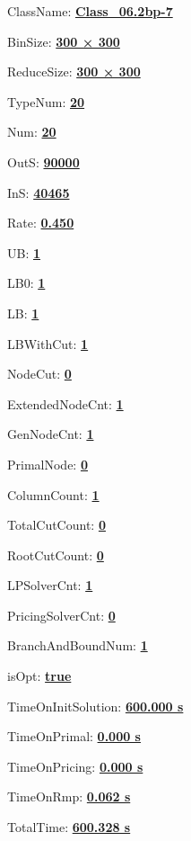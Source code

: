 \documentclass[11pt]{article}
\begin{document}
\pagestyle{empty}


ClassName: \underline{\textbf{Class_06.2bp-7}}
\par
BinSize: \underline{\textbf{300 × 300}}
\par
ReduceSize: \underline{\textbf{300 × 300}}
\par
TypeNum: \underline{\textbf{20}}
\par
Num: \underline{\textbf{20}}
\par
OutS: \underline{\textbf{90000}}
\par
InS: \underline{\textbf{40465}}
\par
Rate: \underline{\textbf{0.450}}
\par
UB: \underline{\textbf{1}}
\par
LB0: \underline{\textbf{1}}
\par
LB: \underline{\textbf{1}}
\par
LBWithCut: \underline{\textbf{1}}
\par
NodeCut: \underline{\textbf{0}}
\par
ExtendedNodeCnt: \underline{\textbf{1}}
\par
GenNodeCnt: \underline{\textbf{1}}
\par
PrimalNode: \underline{\textbf{0}}
\par
ColumnCount: \underline{\textbf{1}}
\par
TotalCutCount: \underline{\textbf{0}}
\par
RootCutCount: \underline{\textbf{0}}
\par
LPSolverCnt: \underline{\textbf{1}}
\par
PricingSolverCnt: \underline{\textbf{0}}
\par
BranchAndBoundNum: \underline{\textbf{1}}
\par
isOpt: \underline{\textbf{true}}
\par
TimeOnInitSolution: \underline{\textbf{600.000 s}}
\par
TimeOnPrimal: \underline{\textbf{0.000 s}}
\par
TimeOnPricing: \underline{\textbf{0.000 s}}
\par
TimeOnRmp: \underline{\textbf{0.062 s}}
\par
TotalTime: \underline{\textbf{600.328 s}}
\par
\newpage
\end{document}
